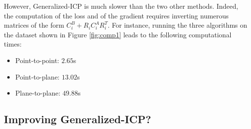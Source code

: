 \documentclass[11pt,letterpaper,leqno]{article}
\begin{document}
However, Generalized-ICP is much slower than the two other methods. Indeed, the computation of the loss and of the gradient requires inverting numerous matrices of the form $C_i^B + R_i C_i^A R_i^T$. For instance, running the three algorithms on the dataset shown in Figure \ref{fig:comp1} leads to the following computational times:
\begin{itemize}
    \item Point-to-point: $2.65$s
    \item Point-to-plane: $13.02$s
    \item Plane-to-plane: $49.88$s
\end{itemize}

\subsection{Improving Generalized-ICP?}
\end{document}
